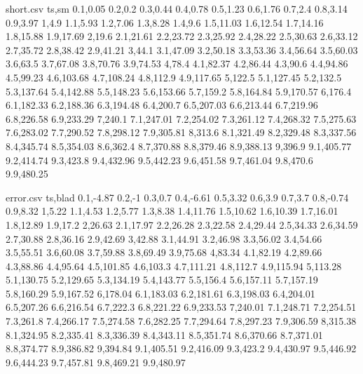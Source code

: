 \documentclass{article}
\begin{document}
	\begin{filecontents*}{short.csv}
		ts,sm
		0.1,0.05
		0.2,0.2
		0.3,0.44
		0.4,0.78
		0.5,1.23
		0.6,1.76
		0.7,2.4
		0.8,3.14
		0.9,3.97
		1,4.9
		1.1,5.93
		1.2,7.06
		1.3,8.28
		1.4,9.6
		1.5,11.03
		1.6,12.54
		1.7,14.16
		1.8,15.88
		1.9,17.69
		2,19.6
		2.1,21.61
		2.2,23.72
		2.3,25.92
		2.4,28.22
		2.5,30.63
		2.6,33.12
		2.7,35.72
		2.8,38.42
		2.9,41.21
		3,44.1
		3.1,47.09
		3.2,50.18
		3.3,53.36
		3.4,56.64
		3.5,60.03
		3.6,63.5
		3.7,67.08
		3.8,70.76
		3.9,74.53
		4,78.4
		4.1,82.37
		4.2,86.44
		4.3,90.6
		4.4,94.86
		4.5,99.23
		4.6,103.68
		4.7,108.24
		4.8,112.9
		4.9,117.65
		5,122.5
		5.1,127.45
		5.2,132.5
		5.3,137.64
		5.4,142.88
		5.5,148.23
		5.6,153.66
		5.7,159.2
		5.8,164.84
		5.9,170.57
		6,176.4
		6.1,182.33
		6.2,188.36
		6.3,194.48
		6.4,200.7
		6.5,207.03
		6.6,213.44
		6.7,219.96
		6.8,226.58
		6.9,233.29
		7,240.1
		7.1,247.01
		7.2,254.02
		7.3,261.12
		7.4,268.32
		7.5,275.63
		7.6,283.02
		7.7,290.52
		7.8,298.12
		7.9,305.81
		8,313.6
		8.1,321.49
		8.2,329.48
		8.3,337.56
		8.4,345.74
		8.5,354.03
		8.6,362.4
		8.7,370.88
		8.8,379.46
		8.9,388.13
		9,396.9
		9.1,405.77
		9.2,414.74
		9.3,423.8
		9.4,432.96
		9.5,442.23
		9.6,451.58
		9.7,461.04
		9.8,470.6
		9.9,480.25
	\end{filecontents*}

	\begin{filecontents*}{error.csv}
ts,blad
0.1,-4.87
0.2,-1
0.3,0.7
0.4,-6.61
0.5,3.32
0.6,3.9
0.7,3.7
0.8,-0.74
0.9,8.32
1,5.22
1.1,4.53
1.2,5.77
1.3,8.38
1.4,11.76
1.5,10.62
1.6,10.39
1.7,16.01
1.8,12.89
1.9,17.2
2,26.63
2.1,17.97
2.2,26.28
2.3,22.58
2.4,29.44
2.5,34.33
2.6,34.59
2.7,30.88
2.8,36.16
2.9,42.69
3,42.88
3.1,44.91
3.2,46.98
3.3,56.02
3.4,54.66
3.5,55.51
3.6,60.08
3.7,59.88
3.8,69.49
3.9,75.68
4,83.34
4.1,82.19
4.2,89.66
4.3,88.86
4.4,95.64
4.5,101.85
4.6,103.3
4.7,111.21
4.8,112.7
4.9,115.94
5,113.28
5.1,130.75
5.2,129.65
5.3,134.19
5.4,143.77
5.5,156.4
5.6,157.11
5.7,157.19
5.8,160.29
5.9,167.52
6,178.04
6.1,183.03
6.2,181.61
6.3,198.03
6.4,204.01
6.5,207.26
6.6,216.54
6.7,222.3
6.8,221.22
6.9,233.53
7,240.01
7.1,248.71
7.2,254.51
7.3,261.8
7.4,266.17
7.5,274.58
7.6,282.25
7.7,294.64
7.8,297.23
7.9,306.59
8,315.38
8.1,324.95
8.2,335.41
8.3,336.39
8.4,343.11
8.5,351.74
8.6,370.66
8.7,371.01
8.8,374.77
8.9,386.82
9,394.84
9.1,405.51
9.2,416.09
9.3,423.2
9.4,430.97
9.5,446.92
9.6,444.23
9.7,457.81
9.8,469.21
9.9,480.97


 	\end{filecontents*}
	
\end{document}
